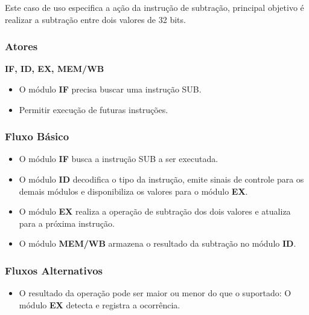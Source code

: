
Este caso de uso especifica a ação da instrução de subtração, principal objetivo é realizar a subtração entre dois valores de 32 bits.
 
\subsubsection*{Atores}
\textbf{IF, ID, EX, MEM/WB}

\preconditions 
\begin{itemize}
 \item O módulo \textbf{IF} precisa buscar uma instrução SUB.
\end{itemize}

\postconditions
\begin{itemize}
  \item Permitir execução de futuras instruções.
\end{itemize}

\subsubsection*{Fluxo Básico}
\begin{itemize}
\item O módulo \textbf{IF} busca a instrução SUB a ser executada.
\item O módulo \textbf{ID} decodifica o tipo da instrução, emite sinais de controle para os demais módulos e disponibiliza os valores para o módulo \textbf{EX}.
\item O módulo \textbf{EX} realiza a operação de subtração dos dois valores e atualiza para a próxima instrução.
\item O módulo \textbf{MEM/WB} armazena o resultado da subtração no módulo \textbf{ID}.
\end{itemize}

\subsubsection*{Fluxos Alternativos}
\begin{itemize}
\item O resultado da operação pode ser maior ou menor do que o suportado:
\subitem O módulo \textbf{EX} detecta e registra a ocorrência.
\end{itemize}

%		

